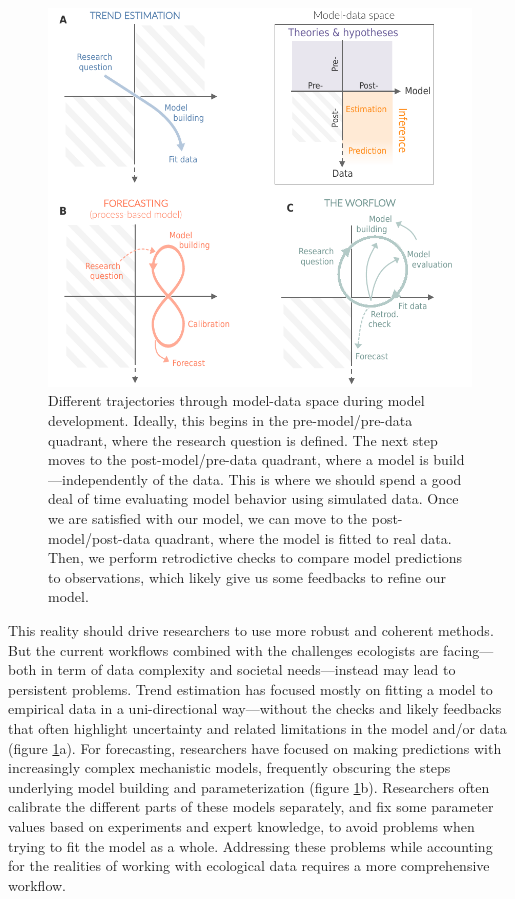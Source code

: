\documentclass[11pt]{article}
\begin{document}
\begin{figure}[h]
	\centering
	\includegraphics{figures/modeldataspaces_rotation}
	\caption{Different trajectories through model-data space during model development. Ideally, this begins in the pre-model/pre-data quadrant, where the research question is defined. The next step moves to the post-model/pre-data quadrant, where a model is build---independently of the data. This is where we should spend a good deal of time evaluating model behavior using simulated data. Once we are satisfied with our model, we can move to the post-model/post-data quadrant, where the model is fitted to real data. Then, we perform retrodictive checks to compare model predictions to observations, which likely give us some feedbacks to refine our model.}
	\label{fig:modeldata}
\end{figure}

This reality should drive researchers to use more robust and coherent methods. But the current workflows combined with the challenges ecologists are facing---both in term of data complexity and societal needs---instead may lead to persistent problems.
Trend estimation has focused mostly on fitting a model to empirical data in a uni-directional way---without the checks and likely feedbacks that often highlight uncertainty and related limitations in the model and/or data (figure \ref{fig:modeldata}a). For forecasting, researchers have focused on making predictions with increasingly complex mechanistic models, frequently obscuring the steps underlying model building and parameterization (figure \ref{fig:modeldata}b). Researchers often calibrate the different parts of these models separately, and fix some parameter values based on experiments and expert knowledge, to avoid problems when trying to fit the model as a whole.
Addressing these problems while accounting for the realities of working with ecological data requires a more comprehensive workflow.
\end{document}
